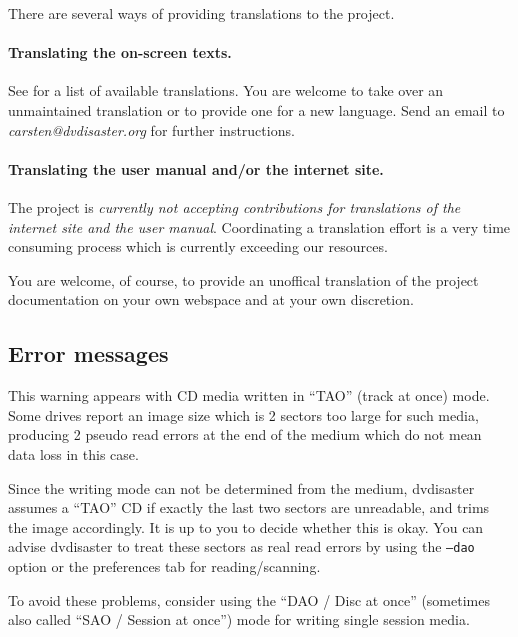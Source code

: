 {There are several ways of providing translations to the project.

  \paragraph{Translating the on-screen texts.} See  for
  a list of available translations. You are welcome to take over an unmaintained
  translation or to provide one for a new language. Send an email to
  {\em carsten@dvdisaster.org} for further instructions.

  \paragraph{Translating the user manual and/or the internet site.} The project
  is {\em currently not accepting contributions for translations of the internet
    site and the user manual}. Coordinating a translation effort is a very time
  consuming process which is currently exceeding our resources. 

  \smallskip
  
  You are welcome, of course, to provide an unoffical translation of the
  project documentation on your own webspace and at your own discretion. }

\newpage

\subsection{Error messages}
\label{qa-error}
\setcounter{qaitem}{0}

   {This warning appears with CD media written in ``TAO'' (track at once) mode.
     Some drives report an image size which is 2 sectors too large for such media,
     producing 2 pseudo read errors at the end of the medium which do not mean data
     loss in this case.

     \smallskip
     
     Since the writing mode can not be determined from the medium, dvdisaster
     assumes a ``TAO'' CD if exactly the last two sectors are unreadable, and
     trims the image accordingly. It is up to you to decide whether this is okay.
     You can advise dvdisaster to treat these sectors as real read errors by using
     the {\tt --dao} option or the preferences tab for reading/scanning.

     \smallskip
     
     To avoid these problems, consider using the ``DAO / Disc at once''
     (sometimes also called ``SAO / Session at once'') mode for writing single session media.}

